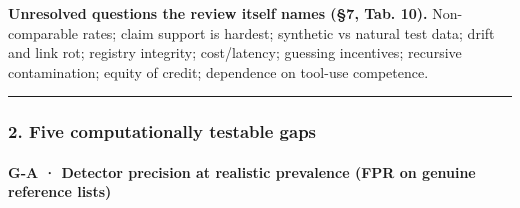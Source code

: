 \documentclass[
  10pt,
]{article}
\begin{document}
\textbf{Unresolved questions the review itself names (§7, Tab. 10).}
Non-comparable rates; claim support is hardest; synthetic vs natural
test data; drift and link rot; registry integrity; cost/latency;
guessing incentives; recursive contamination; equity of credit;
dependence on tool-use competence.

\begin{center}\rule{0.5\linewidth}{0.5pt}\end{center}

\hypertarget{five-computationally-testable-gaps}{%
\subsubsection{2. Five computationally testable
gaps}\label{five-computationally-testable-gaps}}

\hypertarget{g-a-detector-precision-at-realistic-prevalence-fpr-on-genuine-reference-lists}{%
\paragraph{G-A · Detector precision at realistic prevalence (FPR on
genuine reference
lists)}\label{g-a-detector-precision-at-realistic-prevalence-fpr-on-genuine-reference-lists}}
\end{document}
